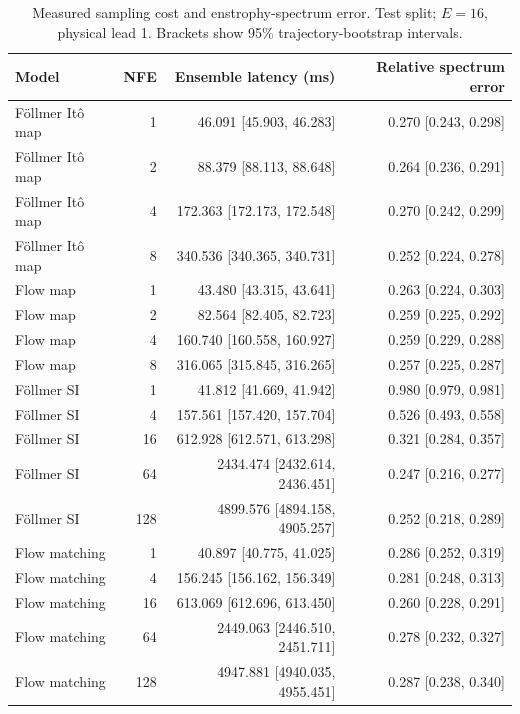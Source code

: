 \begin{table}[t]
\centering
\small
\setlength{\tabcolsep}{3pt}
\caption{Measured sampling cost and enstrophy-spectrum error. Test split; $E=16$, physical lead 1. Brackets show 95\% trajectory-bootstrap intervals.}
\label{tab:map-cost}
\begin{tabular}{lrrr}
\toprule
Model & NFE & Ensemble latency (ms) & Relative spectrum error \\
\midrule
Föllmer Itô map & 1 & 46.091 [45.903, 46.283] & 0.270 [0.243, 0.298] \\
Föllmer Itô map & 2 & 88.379 [88.113, 88.648] & 0.264 [0.236, 0.291] \\
Föllmer Itô map & 4 & 172.363 [172.173, 172.548] & 0.270 [0.242, 0.299] \\
Föllmer Itô map & 8 & 340.536 [340.365, 340.731] & 0.252 [0.224, 0.278] \\
\addlinespace
Flow map & 1 & 43.480 [43.315, 43.641] & 0.263 [0.224, 0.303] \\
Flow map & 2 & 82.564 [82.405, 82.723] & 0.259 [0.225, 0.292] \\
Flow map & 4 & 160.740 [160.558, 160.927] & 0.259 [0.229, 0.288] \\
Flow map & 8 & 316.065 [315.845, 316.265] & 0.257 [0.225, 0.287] \\
\addlinespace
Föllmer SI & 1 & 41.812 [41.669, 41.942] & 0.980 [0.979, 0.981] \\
Föllmer SI & 4 & 157.561 [157.420, 157.704] & 0.526 [0.493, 0.558] \\
Föllmer SI & 16 & 612.928 [612.571, 613.298] & 0.321 [0.284, 0.357] \\
Föllmer SI & 64 & 2434.474 [2432.614, 2436.451] & 0.247 [0.216, 0.277] \\
Föllmer SI & 128 & 4899.576 [4894.158, 4905.257] & 0.252 [0.218, 0.289] \\
\addlinespace
Flow matching & 1 & 40.897 [40.775, 41.025] & 0.286 [0.252, 0.319] \\
Flow matching & 4 & 156.245 [156.162, 156.349] & 0.281 [0.248, 0.313] \\
Flow matching & 16 & 613.069 [612.696, 613.450] & 0.260 [0.228, 0.291] \\
Flow matching & 64 & 2449.063 [2446.510, 2451.711] & 0.278 [0.232, 0.327] \\
Flow matching & 128 & 4947.881 [4940.035, 4955.451] & 0.287 [0.238, 0.340] \\
\bottomrule
\end{tabular}
\end{table}
